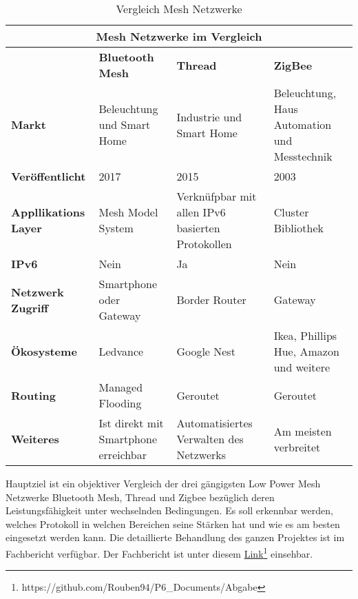 \begin{table}[h]
	\centering
	\begin{adjustbox}{width=1\textwidth}
		\begin{tabular}{@{}|l|l|l|l|@{}}
			\toprule
			\multicolumn{4}{|c|}{\textbf{Mesh Netzwerke im Vergleich}}                                                                                                            \\ \midrule
			& \textbf{Bluetooth Mesh}              & \textbf{Thread}                                  & \textbf{ZigBee}                              \\ \midrule
			\textbf{Markt}               & Beleuchtung und Smart Home           & Industrie und Smart Home                         & Beleuchtung, Haus Automation und Messtechnik \\ \midrule
			\textbf{Veröffentlicht}      & 2017                                 & 2015                                             & 2003                                         \\ \midrule
			\textbf{Appllikations Layer} & Mesh Model System                    & Verknüfpbar mit allen IPv6 basierten Protokollen & Cluster Bibliothek                           \\ \midrule
			\textbf{IPv6}                & Nein                                 & Ja                                               & Nein                                         \\ \midrule
			\textbf{Netzwerk Zugriff}    & Smartphone oder Gateway              & Border Router                                    & Gateway                                      \\ \midrule
			\textbf{Ökosysteme}          & Ledvance                             & Google Nest                                      & Ikea, Phillips Hue, Amazon und weitere       \\ \midrule
			\textbf{Routing}             & Managed Flooding                     & Geroutet                                         & Geroutet                                     \\ \midrule
			\textbf{Weiteres}            & Ist direkt mit Smartphone erreichbar & Automatisiertes Verwalten des Netzwerks          & Am meisten verbreitet                        \\ \bottomrule
		\end{tabular}
	\end{adjustbox}
	\caption{Vergleich Mesh Netzwerke}\label{table:VergleichMeshNetzwerk}
\end{table}

Hauptziel ist ein objektiver Vergleich der drei gängigsten Low Power Mesh Netzwerke Bluetooth Mesh, Thread und Zigbee bezüglich deren Leistungsfähigkeit unter wechselnden Bedingungen. Es soll erkennbar werden, welches Protokoll in welchen Bereichen seine Stärken hat und wie es am besten eingesetzt werden kann. Die detaillierte Behandlung des ganzen Projektes ist im Fachbericht verfügbar. Der Fachbericht ist unter diesem \href{https://github.com/Rouben94/P6_Documents/Abgabe}{Link\footnote{\url{https://github.com/Rouben94/P6_Documents/Abgabe}}} einsehbar.



